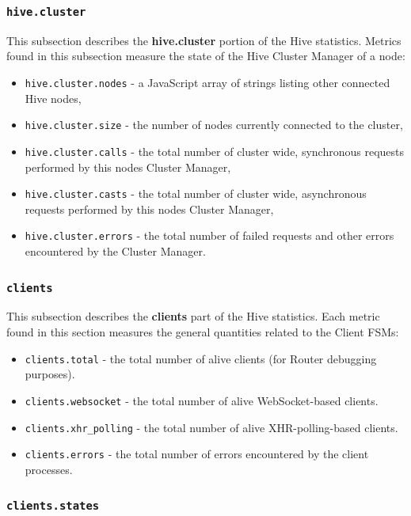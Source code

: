 \documentclass[a4paper]{article}
\begin{document}
\subsubsection{\texttt{hive.cluster}}
\label{sec-4-2-4}

This subsection describes the \textbf{hive.cluster} portion of the Hive statistics. Metrics found in this subsection measure the state of the Hive Cluster Manager of a node:


\begin{itemize}
\item \texttt{hive.cluster.nodes} - a JavaScript array of strings listing other connected Hive nodes,
\item \texttt{hive.cluster.size} - the number of nodes currently connected to the cluster,
\item \texttt{hive.cluster.calls} - the total number of cluster wide, synchronous requests performed by this nodes Cluster Manager,
\item \texttt{hive.cluster.casts} - the total number of cluster wide, asynchronous requests performed by this nodes Cluster Manager,
\item \texttt{hive.cluster.errors} - the total number of failed requests and other errors encountered by the Cluster Manager.
\end{itemize}
\subsubsection{\texttt{clients}}
\label{sec-4-2-5}

This subsection describes the \textbf{clients} part of the Hive statistics. Each metric found in this section measures the general quantities related to the Client FSMs:


\begin{itemize}
\item \texttt{clients.total} - the total number of alive clients (for Router debugging purposes).
\item \texttt{clients.websocket} - the total number of alive WebSocket-based clients.
\item \texttt{clients.xhr\_polling} - the total number of alive XHR-polling-based clients.
\item \texttt{clients.errors} - the total number of errors encountered by the client processes.
\end{itemize}
\subsubsection{\texttt{clients.states}}
\label{sec-4-2-6}
\end{document}
